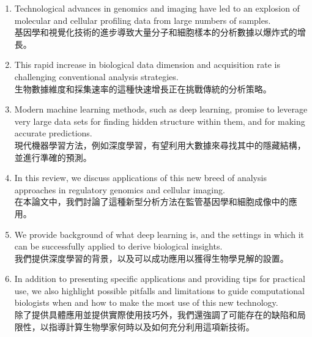 \begin{enumerate}

\item Technological advances in genomics and imaging have led to an explosion of molecular and cellular profiling data from large numbers of samples.  \\
基因學和視覺化技術的進步導致大量分子和細胞樣本的分析數據以爆炸式的增長。\\

\item This rapid increase in biological data dimension and acquisition rate is challenging conventional analysis strategies.  \\
生物數據維度和採集速率的這種快速增長正在挑戰傳統的分析策略。\\

\item Modern machine learning methods, such as deep learning, promise to leverage very large data sets for finding hidden structure within them, and for making accurate predictions.  \\
現代機器學習方法，例如深度學習，有望利用大數據來尋找其中的隱藏結構，並進行準確的預測。\\

\item In this review, we discuss applications of this new breed of analysis approaches in regulatory genomics and cellular imaging.  \\
在本論文中，我們討論了這種新型分析方法在監管基因學和細胞成像中的應用。\\

\item We provide background of what deep learning is, and the settings in which it can be successfully applied to derive biological insights.  \\
我們提供深度學習的背景，以及可以成功應用以獲得生物學見解的設置。\\

\item In addition to presenting specific applications and providing tips for practical use, we also highlight possible pitfalls and limitations to guide computational biologists when and how to make the most use of this new technology. \\
除了提供具體應用並提供實際使用技巧外，我們還強調了可能存在的缺陷和局限性，以指導計算生物學家何時以及如何充分利用這項新技術。\\


\end{enumerate}

